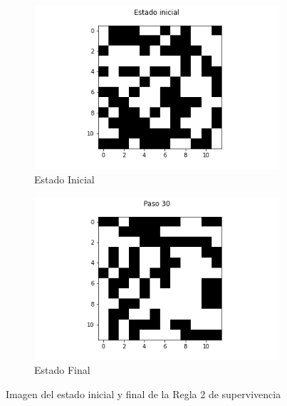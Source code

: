 \documentclass{article}
\begin{document}
\begin{figure}[H]
\centering
\begin{subfigure}[b]{0.45\linewidth}
\includegraphics[width=\linewidth]{p2_r2_t00_p.png}
\caption{Estado Inicial}
\end{subfigure}
\begin{subfigure}[b]{0.45\linewidth}
\includegraphics[width=\linewidth]{p2_r2_t30_p.png}
\caption{Estado Final}
\end{subfigure}
\caption{Imagen del estado inicial y final de la Regla 2 de supervivencia}
\label{fig:westminster}
\end{figure}
\end{document}
